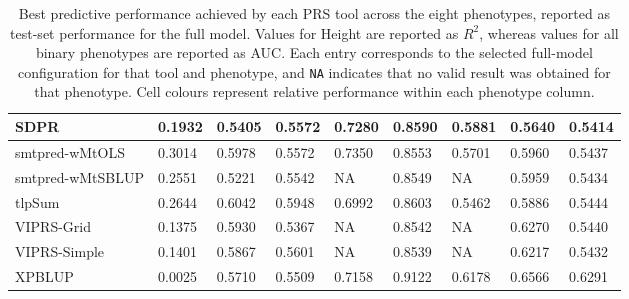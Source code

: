 \documentclass[pdflatex,sn-basic]{sn-jnl}
\begin{document}
\begin{table}[!ht]
{\begin{tabular}{|l|l|l|l|l|l|l|l|l|}
\hline
SDPR \cite{Zhou_2021} & \cellcolor[HTML]{FEE282}0.1932 & \cellcolor[HTML]{FCB87A}0.5405 & \cellcolor[HTML]{FCC27C}0.5572 & \cellcolor[HTML]{B9D780}0.7280 & \cellcolor[HTML]{FEEA83}0.8590 & \cellcolor[HTML]{FDCE7E}0.5881 & \cellcolor[HTML]{FBA175}0.5640 & \cellcolor[HTML]{FEDB81}0.5414 \\
\hline
smtpred-wMtOLS \cite{Maier_2018} & \cellcolor[HTML]{9BCE7F}0.3014 & \cellcolor[HTML]{C6DB81}0.5978 & \cellcolor[HTML]{FCC27C}0.5572 & \cellcolor[HTML]{A1D07F}0.7350 & \cellcolor[HTML]{FEE983}0.8553 & \cellcolor[HTML]{FBA676}0.5701 & \cellcolor[HTML]{FEDC81}0.5960 & \cellcolor[HTML]{FEE983}0.5437 \\
\hline
smtpred-wMtSBLUP \cite{Maier_2018} & \cellcolor[HTML]{CCDD82}0.2551 & \cellcolor[HTML]{FAA075}0.5221 & \cellcolor[HTML]{FCBD7B}0.5542 & NA& \cellcolor[HTML]{FEE983}0.8549 & NA& \cellcolor[HTML]{FEDC81}0.5959 & \cellcolor[HTML]{FEE783}0.5434 \\
\hline
tlpSum \cite{Pattee_2020} & \cellcolor[HTML]{C2DA81}0.2644 & \cellcolor[HTML]{B2D580}0.6042 & \cellcolor[HTML]{E4E483}0.5948 & \cellcolor[HTML]{FEDC81}0.6992 & \cellcolor[HTML]{FFEB84}0.8603 & \cellcolor[HTML]{F8716C}0.5462 & \cellcolor[HTML]{FDCE7E}0.5886 & \cellcolor[HTML]{FFEB84}0.5444 \\
\hline
VIPRS-Grid \cite{Zabad_2023} & \cellcolor[HTML]{FCC17B}0.1375 & \cellcolor[HTML]{D5DF82}0.5930 & \cellcolor[HTML]{FA9E75}0.5367 & NA& \cellcolor[HTML]{FEE883}0.8542 & NA& \cellcolor[HTML]{CFDE82}0.6270 & \cellcolor[HTML]{FFEB84}0.5440 \\
\hline
VIPRS-Simple \cite{Zabad_2023} & \cellcolor[HTML]{FCC27C}0.1401 & \cellcolor[HTML]{E9E583}0.5867 & \cellcolor[HTML]{FDC77D}0.5601 & NA& \cellcolor[HTML]{FEE883}0.8539 & NA& \cellcolor[HTML]{DAE182}0.6217 & \cellcolor[HTML]{FEE683}0.5432 \\
\hline
XPBLUP \cite{Zhang_2023} & \cellcolor[HTML]{F86F6C}0.0025 & \cellcolor[HTML]{FEE081}0.5710 & \cellcolor[HTML]{FCB77A}0.5509 & \cellcolor[HTML]{E2E383}0.7158 & \cellcolor[HTML]{8ECB7E}0.9122 & \cellcolor[HTML]{DAE182}0.6178 & \cellcolor[HTML]{91CC7E}0.6566 & \cellcolor[HTML]{63BE7B}0.6291 \\
\hline
\end{tabular}%
}
\caption{Best predictive performance achieved by each PRS tool across the eight phenotypes, reported as test-set performance for the full model. Values for Height are reported as $R^2$, whereas values for all binary phenotypes are reported as AUC. Each entry corresponds to the selected full-model configuration for that tool and phenotype, and \texttt{NA} indicates that no valid result was obtained for that phenotype. Cell colours represent relative performance within each phenotype column.}
\label{TableBestFullModelSorted}
\end{table}
\end{document}
